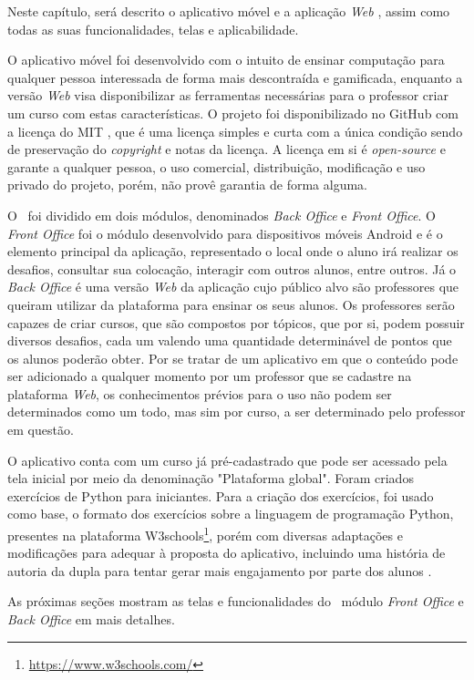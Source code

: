 Neste capítulo, será descrito o aplicativo móvel e a aplicação \textit{Web} \appName, assim como todas as suas funcionalidades, telas e aplicabilidade.

O aplicativo móvel foi desenvolvido com o intuito de ensinar computação para qualquer pessoa interessada de forma mais descontraída e gamificada, enquanto a versão \textit{Web} visa disponibilizar as ferramentas necessárias para o professor criar um curso com estas características. O projeto foi disponibilizado no GitHub com a licença do MIT \cite{mit-license}, que é uma licença simples e curta com a única condição sendo de preservação do \textit{copyright} e notas da licença. A licença em si é \textit{open-source} e garante a qualquer pessoa, o uso comercial, distribuição, modificação e uso privado do projeto, porém, não provê garantia de forma alguma.

O \appName\ foi dividido em dois módulos, denominados \textit{Back Office} e \textit{Front Office}. O \textit{Front Office} foi o módulo desenvolvido para dispositivos móveis Android e é o elemento principal da aplicação, representado o local onde o aluno irá realizar os desafios, consultar sua colocação, interagir com outros alunos, entre outros. Já o \textit{Back Office} é uma versão \textit{Web} da aplicação cujo público alvo são professores que queiram utilizar da plataforma para ensinar os seus alunos. Os professores serão capazes de criar cursos, que são compostos por tópicos, que por si, podem possuir diversos desafios, cada um valendo uma quantidade determinável de pontos que os alunos poderão obter. Por se tratar de um aplicativo em que o conteúdo pode ser adicionado a qualquer momento por um professor que se cadastre na plataforma \textit{Web}, os conhecimentos prévios para o uso não podem ser determinados como um todo, mas sim por curso, a ser determinado pelo professor em questão.

O aplicativo conta com um curso já pré-cadastrado que pode ser acessado pela tela inicial por meio da denominação "Plataforma global". Foram criados exercícios de Python para iniciantes. Para a criação dos exercícios, foi usado como base, o formato dos exercícios sobre a linguagem de programação Python, presentes na plataforma W3schools\footnote{\url{https://www.w3schools.com/}}, porém com diversas adaptações e modificações para adequar à proposta do aplicativo, incluindo uma história de autoria da dupla para tentar gerar mais engajamento por parte dos alunos \cite{gamification_motivates}.

As próximas seções mostram as telas e funcionalidades do \appName\, módulo \textit{Front Office} e \textit{Back Office} em mais detalhes.

